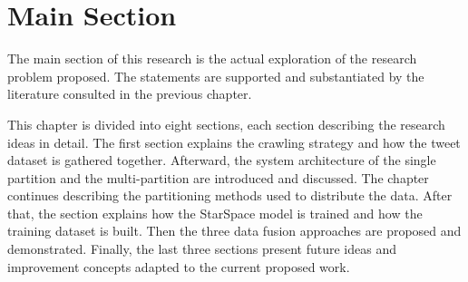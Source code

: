 \chapter{Main Section}

The main section of this research is the actual exploration of the research problem proposed. The statements are supported and substantiated by the literature consulted in the previous chapter.

This chapter is divided into eight sections, each section describing the research ideas in detail. The first section explains the crawling strategy and how the tweet dataset is gathered together. Afterward, the system architecture of the single partition and the multi-partition are introduced and discussed. The chapter continues describing the partitioning methods used to distribute the data. After that, the section explains how the StarSpace model is trained and how the training dataset is built. Then the three data fusion approaches are proposed and demonstrated. Finally, the last three sections present future ideas and improvement concepts adapted to the current proposed work.
